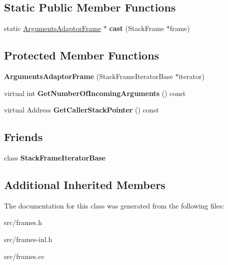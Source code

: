 \subsection*{Static Public Member Functions}
\begin{DoxyCompactItemize}
\item 
\hypertarget{classv8_1_1internal_1_1_arguments_adaptor_frame_a6b8283fe3991c88663621fdf586b67ca}{}static \hyperlink{classv8_1_1internal_1_1_arguments_adaptor_frame}{Arguments\+Adaptor\+Frame} $\ast$ {\bfseries cast} (Stack\+Frame $\ast$frame)\label{classv8_1_1internal_1_1_arguments_adaptor_frame_a6b8283fe3991c88663621fdf586b67ca}

\end{DoxyCompactItemize}
\subsection*{Protected Member Functions}
\begin{DoxyCompactItemize}
\item 
\hypertarget{classv8_1_1internal_1_1_arguments_adaptor_frame_ac2681526413000e2f5879bc2c0b0fd2f}{}{\bfseries Arguments\+Adaptor\+Frame} (Stack\+Frame\+Iterator\+Base $\ast$iterator)\label{classv8_1_1internal_1_1_arguments_adaptor_frame_ac2681526413000e2f5879bc2c0b0fd2f}

\item 
\hypertarget{classv8_1_1internal_1_1_arguments_adaptor_frame_ab8ccfd535f4db6dc07f17f9b43921571}{}virtual int {\bfseries Get\+Number\+Of\+Incoming\+Arguments} () const \label{classv8_1_1internal_1_1_arguments_adaptor_frame_ab8ccfd535f4db6dc07f17f9b43921571}

\item 
\hypertarget{classv8_1_1internal_1_1_arguments_adaptor_frame_aaf7fa9756e23315f0c1343cb7c3ea2e6}{}virtual Address {\bfseries Get\+Caller\+Stack\+Pointer} () const \label{classv8_1_1internal_1_1_arguments_adaptor_frame_aaf7fa9756e23315f0c1343cb7c3ea2e6}

\end{DoxyCompactItemize}
\subsection*{Friends}
\begin{DoxyCompactItemize}
\item 
\hypertarget{classv8_1_1internal_1_1_arguments_adaptor_frame_ac7310421866976ca454bbe11c5f926c3}{}class {\bfseries Stack\+Frame\+Iterator\+Base}\label{classv8_1_1internal_1_1_arguments_adaptor_frame_ac7310421866976ca454bbe11c5f926c3}

\end{DoxyCompactItemize}
\subsection*{Additional Inherited Members}


The documentation for this class was generated from the following files\+:\begin{DoxyCompactItemize}
\item 
src/frames.\+h\item 
src/frames-\/inl.\+h\item 
src/frames.\+cc\end{DoxyCompactItemize}
